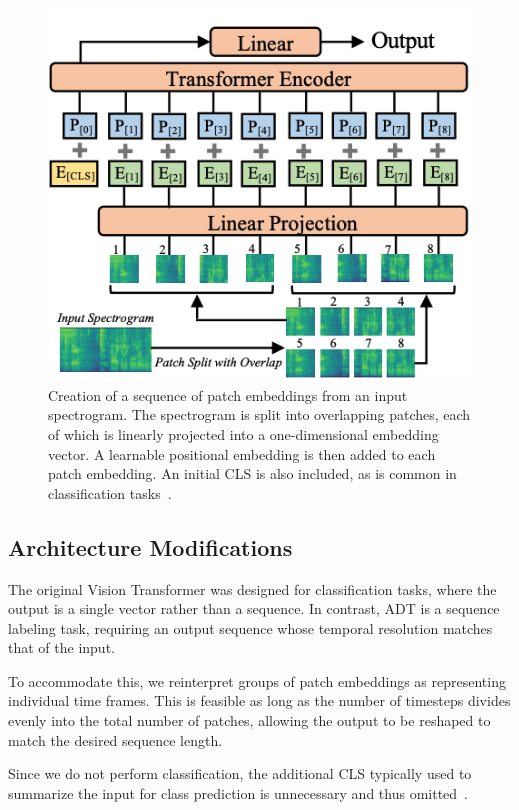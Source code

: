 \begin{figure}[H]
    \centering
    \includegraphics[trim=0 0 0 116, clip, scale=0.7]{figures/patchembedding.png}
    \caption{Creation of a sequence of patch embeddings from an input spectrogram. The spectrogram is split into overlapping patches, each of which is linearly projected into a one-dimensional embedding vector. A learnable positional embedding is then added to each patch embedding. An initial \acrfull{CLS} is also included, as is common in classification tasks~\cite{gong2021astaudiospectrogramtransformer}.}
    \label{PatchEmbeddingFigure}
\end{figure}

\subsection{Architecture Modifications}

The original Vision Transformer was designed for classification tasks, where the output is a single vector rather than a sequence. In contrast, \gls{ADT} is a sequence labeling task, requiring an output sequence whose temporal resolution matches that of the input.

To accommodate this, we reinterpret groups of patch embeddings as representing individual time frames. This is feasible as long as the number of timesteps divides evenly into the total number of patches, allowing the output to be reshaped to match the desired sequence length.

Since we do not perform classification, the additional \gls{CLS} typically used to summarize the input for class prediction is unnecessary and thus omitted~\cite{dosovitskiy2021imageworth16x16words}.

